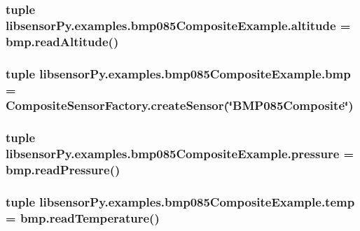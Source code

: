 \subsubsection[{altitude}]{\setlength{\rightskip}{0pt plus 5cm}tuple libsensor\+Py.\+examples.\+bmp085\+Composite\+Example.\+altitude = bmp.\+read\+Altitude()}\label{namespacelibsensorPy_1_1examples_1_1bmp085CompositeExample_a8652461e926b039f8d96506a5dbf9ddd}
\hypertarget{namespacelibsensorPy_1_1examples_1_1bmp085CompositeExample_a573049e3ed87962c4f8c7d2ba73744e5}{}
\subsubsection[{bmp}]{\setlength{\rightskip}{0pt plus 5cm}tuple libsensor\+Py.\+examples.\+bmp085\+Composite\+Example.\+bmp = {\bf Composite\+Sensor\+Factory.\+create\+Sensor}(\char`\"{}B\+M\+P085\+Composite\char`\"{})}\label{namespacelibsensorPy_1_1examples_1_1bmp085CompositeExample_a573049e3ed87962c4f8c7d2ba73744e5}
\hypertarget{namespacelibsensorPy_1_1examples_1_1bmp085CompositeExample_a5cff015035aa44f207e1475e6477ed99}{}
\subsubsection[{pressure}]{\setlength{\rightskip}{0pt plus 5cm}tuple libsensor\+Py.\+examples.\+bmp085\+Composite\+Example.\+pressure = bmp.\+read\+Pressure()}\label{namespacelibsensorPy_1_1examples_1_1bmp085CompositeExample_a5cff015035aa44f207e1475e6477ed99}
\hypertarget{namespacelibsensorPy_1_1examples_1_1bmp085CompositeExample_aa5e5d1869c9e1ab077e648fb20c58c4e}{}
\subsubsection[{temp}]{\setlength{\rightskip}{0pt plus 5cm}tuple libsensor\+Py.\+examples.\+bmp085\+Composite\+Example.\+temp = bmp.\+read\+Temperature()}\label{namespacelibsensorPy_1_1examples_1_1bmp085CompositeExample_aa5e5d1869c9e1ab077e648fb20c58c4e}
